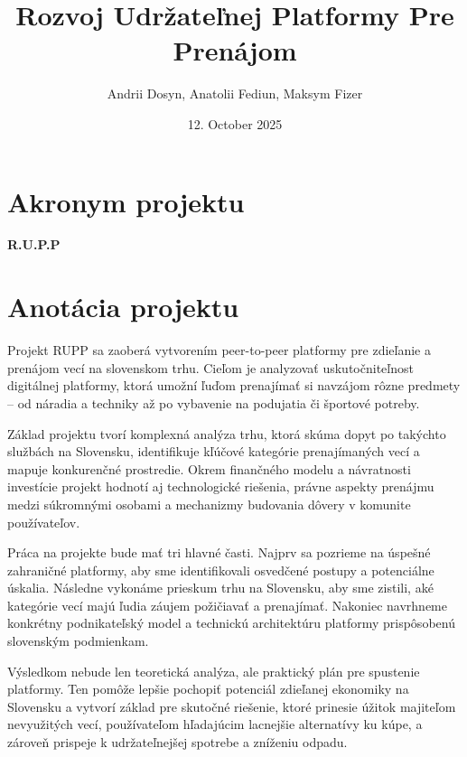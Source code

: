 \documentclass[12pt,twoside,slovak,a4paper]{article}
\title{\textbf{Rozvoj Udržateľnej Platformy Pre Prenájom}} %
\author{Andrii Dosyn, Anatolii Fediun, Maksym Fizer}
\date{\small 12. October 2025} %
\begin{document}
\maketitle

\section*{Akronym projektu}
\textbf{R.U.P.P}


\section*{Anotácia projektu}

Projekt RUPP sa zaoberá vytvorením peer-to-peer platformy pre zdieľanie a prenájom vecí na slovenskom trhu. Cieľom je analyzovať uskutočniteľnost digitálnej platformy, ktorá umožní ľuďom prenajímať si navzájom rôzne predmety – od náradia a techniky až po vybavenie na podujatia či športové potreby. 

Základ projektu tvorí komplexná analýza trhu, ktorá skúma dopyt po takýchto službách na Slovensku, identifikuje kľúčové kategórie prenajímaných vecí a mapuje konkurenčné prostredie. Okrem finančného modelu a návratnosti investície projekt hodnotí aj technologické riešenia, právne aspekty prenájmu medzi súkromnými osobami a mechanizmy budovania dôvery v komunite používateľov.

Práca na projekte bude mať tri hlavné časti. Najprv sa pozrieme na úspešné zahraničné platformy, aby sme identifikovali osvedčené postupy a potenciálne úskalia. Následne vykonáme prieskum trhu na Slovensku, aby sme zistili, aké kategórie vecí majú ľudia záujem požičiavať a prenajímať. Nakoniec navrhneme konkrétny podnikateľský model a technickú architektúru platformy prispôsobenú slovenským podmienkam. 

Výsledkom nebude len teoretická analýza, ale praktický plán pre spustenie platformy. Ten pomôže lepšie pochopiť potenciál zdieľanej ekonomiky na Slovensku a vytvorí základ pre skutočné riešenie, ktoré prinesie úžitok majiteľom nevyužitých vecí, používateľom hľadajúcim lacnejšie alternatívy ku kúpe, a zároveň prispeje k udržateľnejšej spotrebe a zníženiu odpadu.
\end{document}
